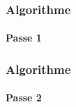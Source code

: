 \begin{frame}[allowframebreaks]
	\frametitle{Algorithme}
	\framesubtitle{Passe 1}
	
\end{frame}

\begin{frame}[allowframebreaks]
	\frametitle{Algorithme}
	\framesubtitle{Passe 2}
	
\end{frame}

%


%    

